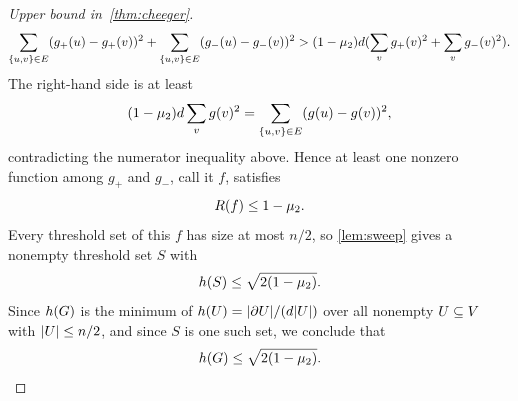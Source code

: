 \begin{proof}[Upper bound in~\cref{thm:cheeger}]
	\begin{equation}
		\sum_{\{u,v\}\in E}(g_+(u)-g_+(v))^2+\sum_{\{u,v\}\in E}(g_-(u)-g_-(v))^2
		>
		(1-\mu_2)d(\sum_v g_+(v)^2+\sum_v g_-(v)^2).
	\end{equation}
	The right-hand side is at least
	\begin{equation}
		(1-\mu_2)d\sum_v g(v)^2
		=
		\sum_{\{u,v\}\in E}(g(u)-g(v))^2,
	\end{equation}
	contradicting the numerator inequality above. Hence at least one nonzero function among \(g_+\) and \(g_-\), call it \(f\), satisfies
	\begin{equation}
		R(f)\leq 1-\mu_2.
	\end{equation}
	Every threshold set of this \(f\) has size at most \(n/2\), so \cref{lem:sweep} gives a nonempty threshold set \(S\) with
	\begin{equation}
		h(S)\leq \sqrt{2(1-\mu_2)}.
	\end{equation}
	Since \(h(G)\) is the minimum of \(h(U)=\lvert\partial U\rvert/(d\lvert U\rvert)\) over all nonempty \(U\subseteq V\) with \(\lvert U\rvert\leq n/2\), and since \(S\) is one such set, we conclude that
	\begin{equation}
		h(G)\leq \sqrt{2(1-\mu_2)}.
	\end{equation}
\end{proof}
